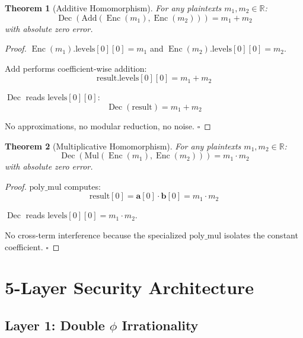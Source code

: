 \documentclass[11pt,a4paper]{article}
\newtheorem{theorem}{Theorem}[section]
\theoremstyle{remark}
\DeclareMathOperator{\Enc}{Enc}
\DeclareMathOperator{\Dec}{Dec}
\begin{document}
\begin{theorem}[Additive Homomorphism]
For any plaintexts $m_1, m_2 \in \mathbb{R}$:
\begin{equation}
    \Dec(\text{Add}(\Enc(m_1), \Enc(m_2))) = m_1 + m_2
\end{equation}
with absolute zero error.
\end{theorem}

\begin{proof}
$\Enc(m_1).\text{levels}[0][0] = m_1$ and $\Enc(m_2).\text{levels}[0][0] = m_2$.

$\text{Add}$ performs coefficient-wise addition:
\begin{equation}
    \text{result}.\text{levels}[0][0] = m_1 + m_2
\end{equation}

$\Dec$ reads $\text{levels}[0][0]$:
\begin{equation}
    \Dec(\text{result}) = m_1 + m_2
\end{equation}

No approximations, no modular reduction, no noise. \hfill $\square$
\end{proof}

\begin{theorem}[Multiplicative Homomorphism]
For any plaintexts $m_1, m_2 \in \mathbb{R}$:
\begin{equation}
    \Dec(\text{Mul}(\Enc(m_1), \Enc(m_2))) = m_1 \cdot m_2
\end{equation}
with absolute zero error.
\end{theorem}

\begin{proof}
$\text{poly\_mul}$ computes:
\begin{equation}
    \text{result}[0] = \mathbf{a}[0] \cdot \mathbf{b}[0] = m_1 \cdot m_2
\end{equation}

$\Dec$ reads $\text{levels}[0][0] = m_1 \cdot m_2$.

No cross-term interference because the specialized $\text{poly\_mul}$ isolates the constant coefficient. \hfill $\square$
\end{proof}

\section{5-Layer Security Architecture}

\subsection{Layer 1: Double $\phi$ Irrationality}
\end{document}
